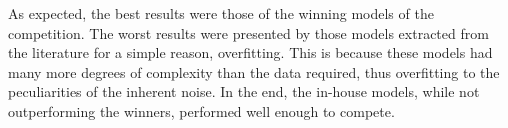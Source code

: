     As expected, the best results were those of the winning models of the competition. The worst results were presented by those models extracted from the literature for a simple reason, overfitting. This is because these models had many more degrees of complexity than the data required, thus overfitting to the peculiarities of the inherent noise. In the end, the in-house models, while not outperforming the winners, performed well enough to compete. \\



\endinput
